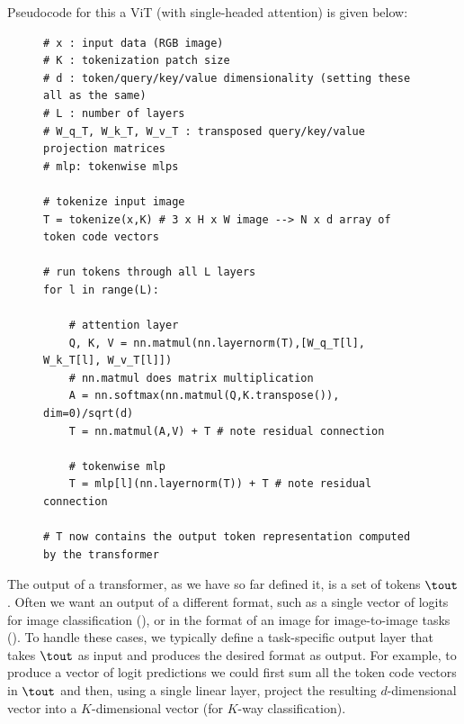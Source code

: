 Pseudocode for this a ViT (with single-headed attention) is given below:%
\begin{figure}[h]
\begin{minipage}{1.0\linewidth}
\begin{verbatim}
# x : input data (RGB image)
# K : tokenization patch size
# d : token/query/key/value dimensionality (setting these all as the same)
# L : number of layers
# W_q_T, W_k_T, W_v_T : transposed query/key/value projection matrices
# mlp: tokenwise mlps

# tokenize input image
T = tokenize(x,K) # 3 x H x W image --> N x d array of token code vectors

# run tokens through all L layers
for l in range(L):

    # attention layer
    Q, K, V = nn.matmul(nn.layernorm(T),[W_q_T[l], W_k_T[l], W_v_T[l]]) 
    # nn.matmul does matrix multiplication
    A = nn.softmax(nn.matmul(Q,K.transpose()), dim=0)/sqrt(d)
    T = nn.matmul(A,V) + T # note residual connection

    # tokenwise mlp
    T = mlp[l](nn.layernorm(T)) + T # note residual connection

# T now contains the output token representation computed by the transformer
\end{verbatim}
\end{minipage}
\end{figure} 

The output of a transformer, as we have so far defined it, is a set of tokens $\tout$. Often we want an output of a different format, such as a single vector of logits for image classification (\sect{\ref{sec:intro_to_learning:image_classification}}), or in the format of an image for image-to-image tasks (\sect{\ref{sec:conditional_generative_models:im2im}}). To handle these cases, we typically define a task-specific output layer that takes $\tout$ as input and produces the desired format as output. For example, to produce a vector of logit predictions we could first sum all the token code vectors in $\tout$ and then, using a single linear layer, project the resulting $d$-dimensional vector into a $K$-dimensional vector (for $K$-way classification).


